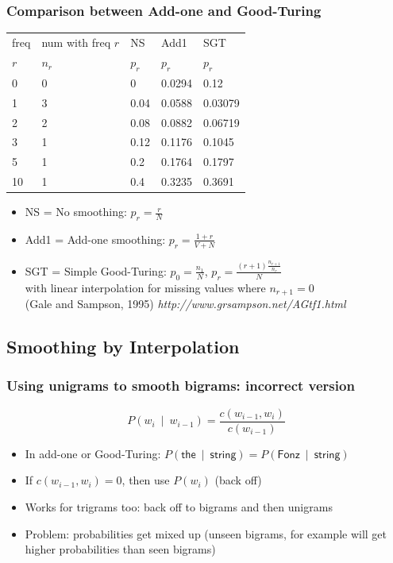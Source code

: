 \documentclass{beamer}
\begin{document}
\begin{frame}
\frametitle{Comparison between Add-one and Good-Turing}
\centering
\begin{tabular}{lllll}
\hline
freq & num with freq $r$ & NS    & Add1  & SGT   \\
$r$  & $n_r$ & $p_r$ & $p_r$ & $p_r$ \\
\hline
0  &  0 & 0    & 0.0294 & 0.12 \\
1  &  3 & 0.04 & 0.0588 & 0.03079 \\
2  &  2 & 0.08 & 0.0882 & 0.06719 \\
3  &  1 & 0.12 & 0.1176 & 0.1045 \\
5  &  1 & 0.2  & 0.1764 & 0.1797 \\
10 &  1 & 0.4  & 0.3235 & 0.3691 \\
\hline
\end{tabular}
\begin{itemize}[<+->]
\item NS = No smoothing: $p_r = \frac{r}{N}$
\item Add1 = Add-one smoothing: $p_r = \frac{1 + r}{V + N}$
\item SGT = Simple Good-Turing: $p_0 = \frac{n_1}{N}$, $p_r = \frac{(r+1) \frac{n_{r+1}}{n_r}}{N}$ \\
with linear interpolation for missing values where $n_{r+1} = 0$ \\
{\small (Gale and Sampson, 1995) \textit{http://www.grsampson.net/AGtf1.html}}
\end{itemize}
\end{frame}

\subsection{Smoothing by Interpolation}

\begin{frame}
\frametitle{Using unigrams to smooth bigrams: incorrect version}
\[ P(w_i~\mid~w_{i-1}) = \frac{ c(w_{i-1},w_i) } { c(w_{i-1}) } \]
\begin{itemize}[<+->]
\item In add-one or Good-Turing: $P(\textsf{the}~\mid~\textsf{string}) = P(\textsf{Fonz}~\mid~\textsf{string})$
\item If $c(w_{i-1},w_i) = 0$, then use $P(w_i)$ (back off)
\item Works for trigrams too: back off to bigrams and then unigrams
\item Problem: probabilities get mixed up (unseen bigrams, for example will get higher probabilities than seen bigrams)
\end{itemize}
\end{frame}
\end{document}

